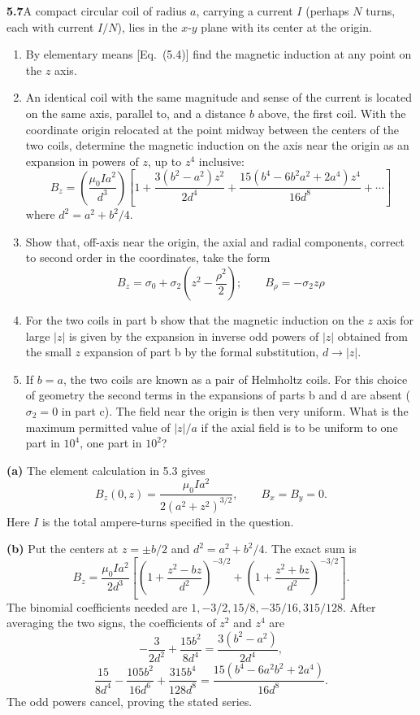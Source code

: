 \par\bigskip
\noindent\textbf{5.7}\quad A compact circular coil of radius $a$, carrying a current $I$ (perhaps $N$ turns, each with current $I/N$), lies in the $x$-$y$ plane with its center at the origin.
\begin{enumerate}
\item[(a)] By elementary means [Eq.~(5.4)] find the magnetic induction at any point on the $z$ axis.
\item[(b)] An identical coil with the same magnitude and sense of the current is located on the same axis, parallel to, and a distance $b$ above, the first coil. With the coordinate origin relocated at the point midway between the centers of the two coils, determine the magnetic induction on the axis near the origin as an expansion in powers of $z$, up to $z^{4}$ inclusive:
\[
B_{z}=\left(\frac{\mu_{0}Ia^{2}}{d^{3}}\right)\!\left[1+\frac{3(b^{2}-a^{2})z^{2}}{2d^{4}}+\frac{15(b^{4}-6b^{2}a^{2}+2a^{4})z^{4}}{16d^{8}}+\cdots\right]
\]
where $d^{2}=a^{2}+b^{2}/4$.
\item[(c)] Show that, off-axis near the origin, the axial and radial components, correct to second order in the coordinates, take the form
\[
B_{z}=\sigma_{0}+\sigma_{2}\left(z^{2}-\frac{\rho^{2}}{2}\right);\qquad B_{\rho}=-\sigma_{2}z\rho
\]
\item[(d)] For the two coils in part b show that the magnetic induction on the $z$ axis for large $|z|$ is given by the expansion in inverse odd powers of $|z|$ obtained from the small $z$ expansion of part b by the formal substitution, $d\to|z|$.
\item[(e)] If $b=a$, the two coils are known as a pair of Helmholtz coils. For this choice of geometry the second terms in the expansions of parts b and d are absent ($\sigma_{2}=0$ in part c). The field near the origin is then very uniform. What is the maximum permitted value of $|z|/a$ if the axial field is to be uniform to one part in $10^{4}$, one part in $10^{2}$?
\end{enumerate}
\solution
\textbf{(a)} The element calculation in 5.3 gives
\[
\boxed{B_z(0,z)=\frac{\mu_0Ia^2}{2(a^2+z^2)^{3/2}},\qquad
B_x=B_y=0.}
\]
Here $I$ is the total ampere-turns specified in the question.

\textbf{(b)} Put the centers at $z=\pm b/2$ and
$d^2=a^2+b^2/4$. The exact sum is
\[
B_z=\frac{\mu_0Ia^2}{2d^3}
\left[\left(1+\frac{z^2-bz}{d^2}\right)^{-3/2}
+\left(1+\frac{z^2+bz}{d^2}\right)^{-3/2}\right].
\]
The binomial coefficients needed are
$1,-3/2,15/8,-35/16,315/128$.
After averaging the two signs, the coefficients of $z^2$ and $z^4$ are
\[
-\frac3{2d^2}+\frac{15b^2}{8d^4}
=\frac{3(b^2-a^2)}{2d^4},
\]
\[
\frac{15}{8d^4}-\frac{105b^2}{16d^6}
+\frac{315b^4}{128d^8}
=\frac{15(b^4-6a^2b^2+2a^4)}{16d^8}.
\]
The odd powers cancel, proving the stated series.

